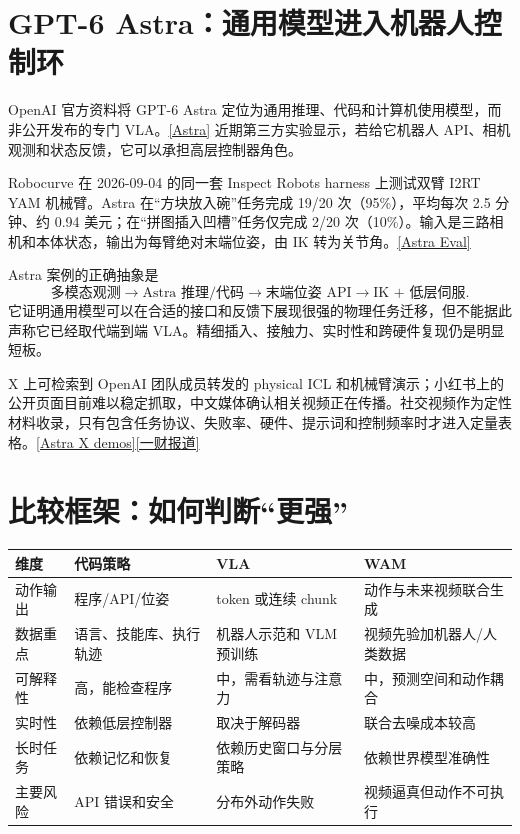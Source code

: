 \documentclass[UTF8,a4paper,11pt]{ctexart}
\begin{document}
\section{GPT-6 Astra：通用模型进入机器人控制环}
OpenAI 官方资料将 GPT-6 Astra 定位为通用推理、代码和计算机使用模型，而非公开发布的专门 VLA。\href{https://openai.com/index/gpt-6-astra/}{[Astra]} 近期第三方实验显示，若给它机器人 API、相机观测和状态反馈，它可以承担高层控制器角色。

Robocurve 在 2026-09-04 的同一套 Inspect Robots harness 上测试双臂 I2RT YAM 机械臂。Astra 在“方块放入碗”任务完成 19/20 次（95\%），平均每次 2.5 分钟、约 0.94 美元；在“拼图插入凹槽”任务仅完成 2/20 次（10\%）。输入是三路相机和本体状态，输出为每臂绝对末端位姿，由 IK 转为关节角。\href{https://openai.robocurve.org/gpt-6-astra/}{[Astra Eval]}

\begin{keybox}
Astra 案例的正确抽象是
\[
 \text{多模态观测} \rightarrow \text{Astra 推理/代码} \rightarrow \text{末端位姿 API} \rightarrow \text{IK + 低层伺服}.
\]
它证明通用模型可以在合适的接口和反馈下展现很强的物理任务迁移，但不能据此声称它已经取代端到端 VLA。精细插入、接触力、实时性和跨硬件复现仍是明显短板。
\end{keybox}

X 上可检索到 OpenAI 团队成员转发的 physical ICL 和机械臂演示；小红书上的公开页面目前难以稳定抓取，中文媒体确认相关视频正在传播。社交视频作为定性材料收录，只有包含任务协议、失败率、硬件、提示词和控制频率时才进入定量表格。\href{https://www.sotwe.com/npew?lang=en}{[Astra X demos]}\;\href{https://www.yicai.com/news/103359498.html}{[一财报道]}

\section{比较框架：如何判断“更强”}
\begin{longtable}{p{3.1cm}p{3.2cm}p{3.2cm}p{3.2cm}}
\toprule
维度 & 代码策略 & VLA & WAM\\
\midrule
动作输出 & 程序/API/位姿 & token 或连续 chunk & 动作与未来视频联合生成\\
数据重点 & 语言、技能库、执行轨迹 & 机器人示范和 VLM 预训练 & 视频先验加机器人/人类数据\\
可解释性 & 高，能检查程序 & 中，需看轨迹与注意力 & 中，预测空间和动作耦合\\
实时性 & 依赖低层控制器 & 取决于解码器 & 联合去噪成本较高\\
长时任务 & 依赖记忆和恢复 & 依赖历史窗口与分层策略 & 依赖世界模型准确性\\
主要风险 & API 错误和安全 & 分布外动作失败 & 视频逼真但动作不可执行\\
\bottomrule
\end{longtable}
\end{document}
